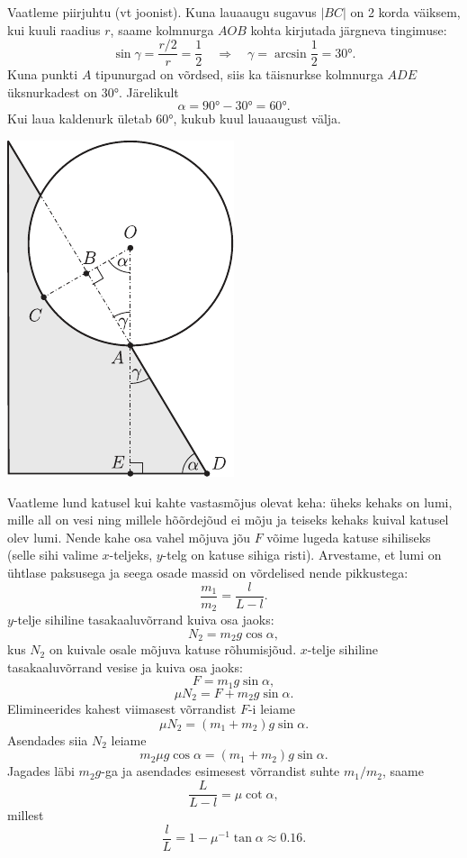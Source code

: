 \documentclass[10pt, twoside]{article}
\begin{document}
{Vaatleme piirjuhtu (vt joonist). Kuna lauaaugu sugavus $|BC|$ on 2 korda väiksem, kui kuuli raadius $r$, saame kolmnurga $AOB$ kohta kirjutada järgneva tingimuse:
\[
\sin \gamma=\frac{r / 2}{r}=\frac{1}{2} \quad \Rightarrow \quad \gamma=\arcsin \frac{1}{2}=\ang{30}.
\]
Kuna punkti $A$ tipunurgad on võrdsed, siis ka täisnurkse kolmnurga $ADE$ üksnurkadest on \ang{30}. Järelikult
\[
\alpha = \ang{90} - \ang{30} = \ang{60}.
\]
Kui laua kaldenurk ületab \ang{60}, kukub kuul lauaaugust välja.
\begin{center}
	\includegraphics[width=0.35\linewidth]{2005-lahg-03-lah}
\end{center}
\probend
\bigskip


\solu
Vaatleme lund katusel kui kahte vastasmõjus olevat keha: üheks kehaks on lumi, mille all on vesi ning millele hõõrdejõud ei mõju ja teiseks kehaks kuival katusel olev lumi. Nende kahe osa vahel mõjuva jõu $F$ võime lugeda katuse sihiliseks (selle sihi valime $x$-teljeks, $y$-telg on katuse sihiga risti). Arvestame, et lumi on ühtlase paksusega ja seega osade massid on võrdelised nende pikkustega: 
\[
\frac{m_1}{m_2} = \frac{l}{L-l}.
\]
$y$-telje sihiline tasakaaluvõrrand kuiva osa jaoks:
\[
N_2 = m_2g \cos \alpha,
\]
kus $N_2$ on kuivale osale mõjuva katuse rõhumisjõud. $x$-telje sihiline tasakaaluvõrrand vesise ja kuiva osa jaoks:
\[
F = m_1g \sin \alpha,
\]
\[
\mu N_2 = F + m_2g \sin \alpha.
\]
Elimineerides kahest viimasest võrrandist $F$-i leiame
\[
\mu N_2 = (m_1 + m_2) g \sin \alpha.
\]
Asendades siia $N_2$ leiame
\[
m_2\mu g \cos \alpha = (m_1 + m_2) g \sin \alpha.
\]
Jagades läbi $m_2g$-ga ja asendades esimesest võrrandist suhte $m_1/m_2$, saame
\[
\frac{L}{L-l}=\mu \cot \alpha,
\]
millest
\[
\frac{l}{L}=1-\mu^{-1} \tan \alpha \approx \num{0,16}.
\]

}
\end{document}
